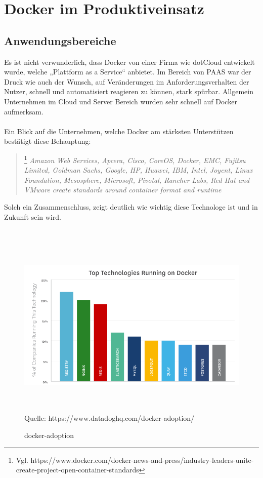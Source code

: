 \documentclass[12pt,toc=bib,toc=listof]{scrreprt}
\begin{document}

\chapter{Docker im Produktiveinsatz}
\section{Anwendungsbereiche}

Es ist nicht verwunderlich, dass Docker von einer Firma wie dotCloud entwickelt wurde, welche „Plattform as a Service“ anbietet.
Im Bereich von PAAS war der Druck wie auch der Wunsch, auf Veränderungen im Anforderungsverhalten der Nutzer, schnell und automatisiert reagieren zu können, stark spürbar. 
Allgemein Unternehmen im Cloud und Server Bereich wurden sehr schnell auf Docker aufmerksam. \\
\\
Ein Blick auf die Unternehmen, welche Docker am stärksten Unterstützen bestätigt diese Behauptung:
\begin{quote}
	\footnote[1]{Vgl. https://www.docker.com/docker-news-and-press/industry-leaders-unite-create-project-open-container-standards}
	\textit{Amazon Web Services, Apcera, Cisco, CoreOS, Docker, EMC, Fujitsu Limited, Goldman Sachs, Google, HP, Huawei, IBM, Intel, Joyent, Linux Foundation, Mesosphere, Microsoft, Pivotal, Rancher Labs, Red Hat and VMware create standards around container format and runtime}
\end{quote}
Solch ein Zusammenschluss, zeigt deutlich wie wichtig diese Technologe ist und  in Zukunft sein wird.\\
\\
\begin{figure}
	\centering
	\caption{docker-adoption}
	\includegraphics[width=15cm, height=9cm, scale=0.3]{docker-adoption.png}
	Quelle: https://www.datadoghq.com/docker-adoption/
\end{figure}
\end{document}
